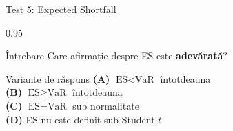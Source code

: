 \documentclass[9pt, aspectratio=169, t]{beamer}
\begin{document}
\begin{frame}{Test 5: Expected Shortfall}
\begin{cminipage}{0.95\textwidth}
    \begin{alertblock}{Întrebare}
        Care afirmație despre ES este \textbf{adevărată}?
    \end{alertblock}

    \vspace{0.5cm}
    \begin{block}{Variante de răspuns}
    \textcolor{MainBlue}{\textbf{(A)}} $\text{ES} < \text{VaR}$ întotdeauna\\[3pt]
    \textcolor{MainBlue}{\textbf{(B)}} $\text{ES} \geq \text{VaR}$ întotdeauna\\[3pt]
    \textcolor{MainBlue}{\textbf{(C)}} $\text{ES} = \text{VaR}$ sub normalitate\\[3pt]
    \textcolor{MainBlue}{\textbf{(D)}} ES nu este definit sub Student-$t$
    \end{block}
\end{cminipage}
\end{frame}
\end{document}
